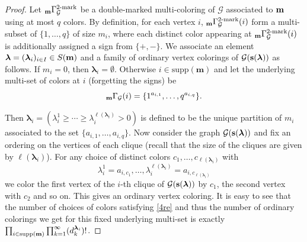 \documentclass[11pt,reqno]{amsart}
\numberwithin{equation}{section} %
\theoremstyle{definition}
\theoremstyle{remark}
\numberwithin{equation}{section}
\begin{document}
\begin{proof}
Let ${_{\bold{m}}\Gamma^{2\text{-mark}}_\mathcal{G}}$ be a double-marked multi-coloring of $\mathcal{G}$ associated to $\bold{m}$ using at most $q$ colors.
By definition, for each vertex $i$,  ${_{\bold{m}}\Gamma^{2\text{-mark}}_\mathcal{G}}(i)$ form a multi-subset of $\{1,\dots,q\}$ of size $m_i$, where each distinct color appearing at ${_{\bold{m}}\Gamma^{2\text{-mark}}_\mathcal{G}}(i)$ is additionally assigned a sign from $\{+,-\}$.  We associate an element $\boldsymbol{\lambda} = (\boldsymbol{\lambda}_i)_{i\in I}\in S(\bold m)$ and a family of ordinary vertex colorings of $\mathcal{G}(\bold s(\boldsymbol{\lambda}))$ as follows. If $m_i=0$, then $\boldsymbol{\lambda}_i=\emptyset$. Otherwise $i\in \mathrm{supp}(\mathbf{m})$ and let the underlying multi-set of colors at $i$ (forgetting the signs) be 
$${_{\bold{m}}\Gamma_{\mathcal{G}}}(i)=\{1^{a_{i,1}},\dots,q^{a_{i,q}}\}.$$

Then $\boldsymbol{\lambda}_i=(\lambda^1_i\ge \cdots \ge \lambda^{\ell(\boldsymbol{\lambda}_i)}_i>0)$ is defined to be the unique partition of $m_i$ associated to the set $\{a_{i,1},\dots,a_{i,q}\}$. Now consider the graph $\mathcal{G}(\bold s(\boldsymbol{\lambda}))$ and fix an ordering on the vertices of each clique (recall that the size of the cliques are given by $\ell(\boldsymbol{\lambda}_i)$). For any choice of distinct colors $c_1,\dots,c_{\ell(\boldsymbol{\lambda}_i)}$ with
\begin{equation}\label{4re}
\lambda^1_i=a_{i,c_1},\dots,\lambda^{\ell(\boldsymbol{\lambda}_i)}_i=a_{i,c_{\ell(\boldsymbol{\lambda}_i)}}
\end{equation}
we color the first vertex of the $i$-th clique of $\mathcal{G}(\bold s(\boldsymbol{\lambda}))$ by $c_1$, the second vertex with $c_2$ and so on. This gives an ordinary vertex coloring. It is easy to see that the number of choices of colors satisfying \eqref{4re} and thus the number of ordinary colorings we get for this fixed underlying multi-set is exactly $\prod_{i\in \mathrm{supp}(\bold m)}\prod_{k=1}^{\infty}(d^{\boldsymbol{\lambda}_i}_{k})!$.


\end{proof}
\end{document}

